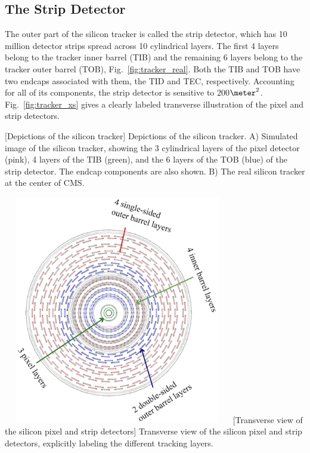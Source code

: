 \subsection{The Strip Detector}
\label{sec:strip}
The outer part of the silicon tracker is called the strip detector, which has 10 million detector strips spread across 10 cylindrical layers.
The first 4 layers belong to the tracker inner barrel (TIB) and the remaining 6 layers belong to the tracker outer barrel (TOB), Fig.~\ref{fig:tracker_real}. 
Both the TIB and TOB have two endcaps associated with them, the TID and TEC, respectively.
Accounting for all of its components, the strip detector is sensitive to 200$\meter^2$.
Fig.~\ref{fig:tracker_xs} gives a clearly labeled transverse illustration of the pixel and strip detectors.
\begin{multiFigure}
    \centering
        [Depictions of the silicon tracker]
        {Depictions of the silicon tracker.
        \;A) Simulated image of the silicon tracker, showing the 3 cylindrical layers of the pixel detector (pink), 4 layers of the TIB (green), and the 6 layers of the TOB (blue) of the strip detector.
        The endcap components are also shown.
        \;B) The real silicon tracker at the center of CMS.
        } 
    \label{fig:tracker_real}
\end{multiFigure}
\begin{multiFigure}
    \centering
    \includegraphics[width=10cm,height=10cm,keepaspectratio]{figures/cms/tracker/silicon_tracker_transverse_view.png}
        [Transverse view of the silicon pixel and strip detectors]
        {Transverse view of the silicon pixel and strip detectors, explicitly labeling the different tracking layers.}
    \label{fig:tracker_xs}
\end{multiFigure}
